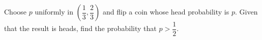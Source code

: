 Choose $p$ uniformly in $(\dfrac{1}{3},\dfrac{2}{3})$ and flip a coin whose head probability is $p$. Given that the result is heads, find the probability that $p>\dfrac{1}{2}$.
